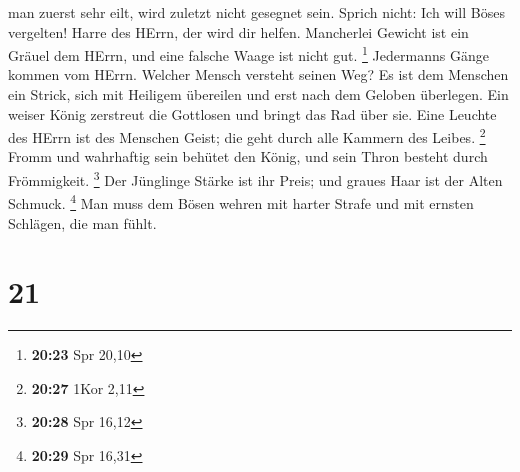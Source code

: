 man zuerst sehr eilt, wird zuletzt nicht gesegnet sein. 
Sprich nicht: Ich will Böses vergelten! Harre des HErrn, der wird dir
helfen.  Mancherlei Gewicht ist ein Gräuel dem HErrn, und
eine falsche Waage ist nicht gut. \footnote{\textbf{20:23} Spr 20,10}
 Jedermanns Gänge kommen vom HErrn. Welcher Mensch
versteht seinen Weg?  Es ist dem Menschen ein Strick,
sich mit Heiligem übereilen und erst nach dem Geloben überlegen.
 Ein weiser König zerstreut die Gottlosen und bringt das
Rad über sie.  Eine Leuchte des HErrn ist des Menschen
Geist; die geht durch alle Kammern des Leibes. \footnote{\textbf{20:27}
  1Kor 2,11}  Fromm und wahrhaftig sein behütet den
König, und sein Thron besteht durch Frömmigkeit. \footnote{\textbf{20:28}
  Spr 16,12}  Der Jünglinge Stärke ist ihr Preis; und
graues Haar ist der Alten Schmuck. \footnote{\textbf{20:29} Spr 16,31}
 Man muss dem Bösen wehren mit harter Strafe und mit
ernsten Schlägen, die man fühlt.

\hypertarget{section-20}{%
\section{21}\label{section-20}}

